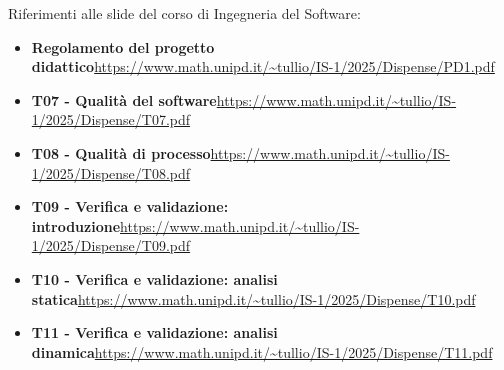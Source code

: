 \documentclass[a4paper,12pt]{article}
\begin{document}
{{{            Riferimenti alle slide del corso di Ingegneria del Software:
            \begin{itemize}
                \item \textbf{Regolamento del progetto didattico}\newline \url{https://www.math.unipd.it/~tullio/IS-1/2025/Dispense/PD1.pdf}
                \item \textbf{T07 - Qualità del software}\newline \url{https://www.math.unipd.it/~tullio/IS-1/2025/Dispense/T07.pdf}
                \item \textbf{T08 - Qualità di processo}\newline \url{https://www.math.unipd.it/~tullio/IS-1/2025/Dispense/T08.pdf}
                \item \textbf{T09 - Verifica e validazione: introduzione}\newline \url{https://www.math.unipd.it/~tullio/IS-1/2025/Dispense/T09.pdf}
                \item \textbf{T10 - Verifica e validazione: analisi statica}\newline \url{https://www.math.unipd.it/~tullio/IS-1/2025/Dispense/T10.pdf}
                \item \textbf{T11 - Verifica e validazione: analisi dinamica}\newline \url{https://www.math.unipd.it/~tullio/IS-1/2025/Dispense/T11.pdf}
            \end{itemize}
        }
    }
}

\newpage
\end{document}
